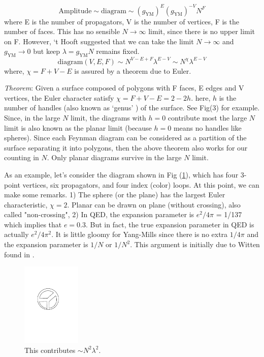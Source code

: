 \[  \text{Amplitude} \sim \text{diagram} \sim (g_{\text{YM}})^{E} (g_{\text{YM}})^{-V} N^{F} \] 
where E is the number of propagators, V is the number of vertices, F is the number of faces. This has no sensible
$N \to \infty$ limit, since there is no upper limit on F. However, `t Hooft suggested that we can
take the limit $N \to \infty$ and $g_{\text{YM}} \to 0$ but keep $\lambda = g_{\text{YM}} N $ remains fixed. 
\[ \text{diagram}(V,E,F) \sim N^{V-E+F} \lambda^{E-V}  \sim N^{\chi} \lambda^{E-V} \] 
where, $\chi = F + V - E$ is assured by a theorem due to Euler. 

\emph{Theorem}: Given a surface composed of polygons with F faces, E edges and V vertices, the Euler character satisfy
$\chi = F + V - E = 2 - 2h$. 
here, $h$ is the number of handles (also known as `genus' ) of the surface. See Fig(3) for example. 
Since, in the large $N$ limit, the diagrams with $h = 0$ contribute most 
the large $N$ limit is also known as the planar limit (because $h=0$ means no handles like spheres). Since each Feynman 
diagram can be considered as a partition of the surface separating it into polygons, then the
above theorem also works for our counting in $N$. Only planar diagrams survive in the large $N$ limit.  

As an example, let's consider the diagram shown in Fig (\ref{fig:dia1}), which has four 3-point vertices, six propagators, and four index (color) loops. 
At this point, we can make some remarks. 1)  The sphere (or the plane) has the largest Euler characteristic, $\chi = 2$. 
Planar can be drawn on plane (without crossing), also called "non-crossing", 2) In QED, the expansion parameter is $e^2/4\pi$ = 
1/137 which implies that $ e = 0.3$. But in fact, the true expansion parameter in QED is actually  $e^2/4\pi^2$. It is little gloomy 
for Yang-Mills since there is no
extra $1/4\pi$ and the expansion parameter is $1/N$ or $1/N^2$. This argument is initially due to Witten found in 
\cite{SCA}. 


\begin{figure}
 \label{fig:dia1}
\begin{center}\includegraphics[width=0.25\textwidth]{./Figures/DL5}\end{center}
\caption{\label{fig:dia1}This contributes $\sim N^2 \lambda^2$.}
\end{figure}


